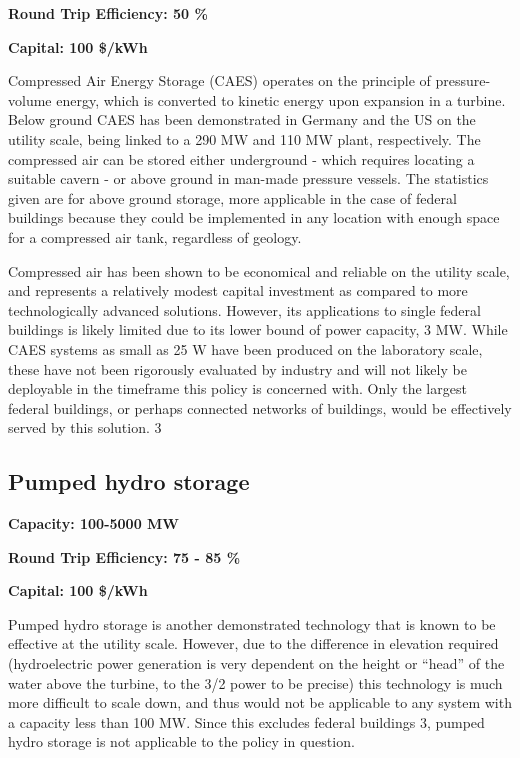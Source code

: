 \noindent\textbf{Round Trip Efficiency: 50 \%}

\noindent\textbf{Capital: 100 \$/kWh}

Compressed Air Energy Storage (CAES) operates on the principle of
pressure-volume energy, which is converted to kinetic energy upon expansion in
a turbine. Below ground CAES has been demonstrated in Germany and the US on the
utility scale, being linked to a 290 MW and 110 MW plant, respectively. The
compressed air can be stored either underground - which requires locating a
suitable cavern - or above ground in man-made pressure vessels. The statistics
given are for above ground storage, more applicable in the case of federal
buildings because they could be implemented in any location with enough space
for a compressed air tank, regardless of geology.

Compressed air has been shown to be economical and reliable on the utility
scale, and represents a relatively modest capital investment as compared to
more technologically advanced solutions. However, its applications to single
federal buildings is likely limited due to its lower bound of power capacity, 3
MW. While CAES systems as small as 25 W have been produced on the laboratory
scale, these have not been rigorously evaluated by industry and will not likely
be deployable in the timeframe this policy is concerned with. Only the largest federal
buildings, or perhaps connected networks of buildings, would be effectively
served by this solution. \cite{patrick}{3}

\subsection{Pumped hydro storage}
\textbf{Capacity: 100-5000 MW}

\noindent\textbf{Round Trip Efficiency: 75 - 85 \%}

\noindent\textbf{Capital: 100 \$/kWh}

Pumped hydro storage is another demonstrated technology that is known to be
effective at the utility scale. However, due to the difference in elevation
required (hydroelectric power generation is very dependent on the height or
``head'' of the water above the turbine, to the 3/2 power to be precise) this
technology is much more difficult to scale down, and thus would not be
applicable to any system with a capacity less than 100 MW. Since this excludes
federal buildings \cite{patrick}{3}, pumped hydro storage is not applicable to the policy in
question.

